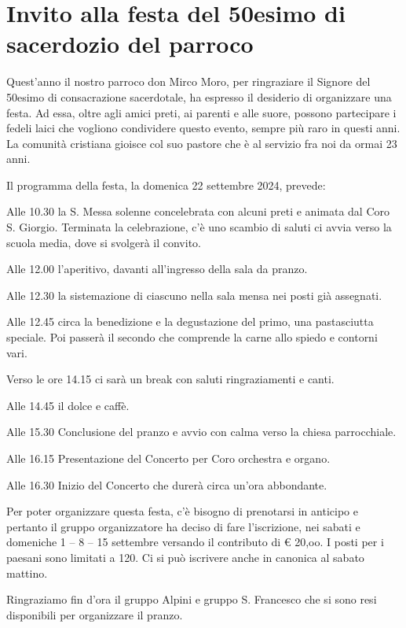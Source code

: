 \section{Invito alla festa del 50esimo di sacerdozio del parroco}

Quest’anno il nostro parroco don Mirco Moro, per ringraziare il Signore del 50esimo di consacrazione sacerdotale, ha espresso il desiderio di organizzare una festa. Ad essa, oltre agli amici preti, ai parenti e alle suore, possono partecipare i fedeli laici che vogliono condividere questo evento, sempre più raro in questi anni. La comunità cristiana gioisce col suo pastore che è al servizio fra noi da ormai 23 anni.

Il programma della festa, la domenica 22 settembre 2024, prevede:

Alle 10.30 la S. Messa solenne concelebrata con alcuni preti e animata dal Coro S. Giorgio. Terminata la celebrazione, c’è uno scambio di saluti ci avvia verso la scuola media, dove si svolgerà il convito.

Alle 12.00 l’aperitivo, davanti all’ingresso della sala da pranzo.

Alle 12.30 la sistemazione di ciascuno nella sala mensa nei posti già assegnati.

Alle 12.45 circa la benedizione e la degustazione del primo, una pastasciutta speciale. Poi passerà il secondo che comprende la carne allo spiedo e contorni vari.

Verso le ore 14.15 ci sarà un break con saluti ringraziamenti e canti.

Alle 14.45 il dolce e caffè.

Alle 15.30 Conclusione del pranzo e avvio con calma verso la chiesa parrocchiale.

Alle 16.15 Presentazione del Concerto per Coro orchestra e organo.

Alle 16.30 Inizio del Concerto che durerà circa un’ora abbondante.

Per poter organizzare questa festa, c’è bisogno di prenotarsi in anticipo e pertanto il gruppo organizzatore ha deciso di fare l’iscrizione, nei sabati e domeniche 1 -- 8 -- 15 settembre versando il contributo di € 20,oo. I posti per i paesani sono limitati a 120. Ci si può iscrivere anche in canonica al sabato mattino.

Ringraziamo fin d’ora il gruppo Alpini e gruppo S. Francesco che si sono resi disponibili per organizzare il pranzo.

